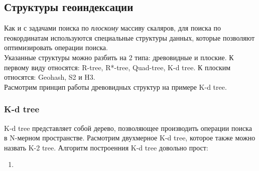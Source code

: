 \documentclass{article}
\begin{document}
\subsection{Структуры геоиндексации}
Как и с задачами поиска по \textit{плоскому} массиву скаляров, для поиска по геокординатам используются специальные структуры данных, которые позволяют оптимизировать операции поиска. \\
Указанные структуры можно разбить на 2 типа: древовидные и плоские. К первому виду относятся: R-tree, R*-tree, Quad-tree, K-d tree. К плоским относятся: Geohash, S2 и H3. \\
Расмотрим принцип работы древовидных структур на примере K-d tree.\\
\subsubsection{K-d tree}
K-d tree представляет собой дерево, позволяющее производить операции поиска в N-мерном пространстве. Расмотрим двухмерное K-d tree, которое также можно назвать K-2 tree.
Алгоритм построенния K-d tree довольно прост:
\begin{enumerate}
    \item
\end{enumerate}
\end{document}
